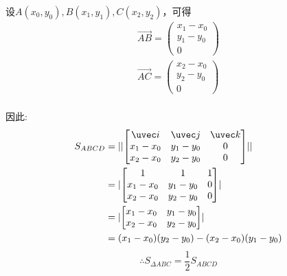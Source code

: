 设$A(x_0, y_0), B(x_1, y_1), C(x_2, y_2)$，可得
\begin{equation}
\begin{aligned}
\vec{AB}=\begin{pmatrix}x_1-x_0 \\ y_1-y_0\\0\end{pmatrix}\\
\vec{AC}=\begin{pmatrix}x_2-x_0 \\ y_2-y_0\\0\end{pmatrix}\\
\end{aligned}
\end{equation}

因此:
\begin{equation}
\begin{aligned}
S_{ABCD}&=\lvert\lvert \begin{bmatrix}
\uvec i & \uvec j & \uvec k \\
x_1-x_0 & y_1-y_0 & 0\\
x_2-x_0 & y_2-y_0 & 0
\end{bmatrix}\rvert\rvert \\
&= \lvert \begin{bmatrix}
1 & 1 & 1 \\
x_1-x_0 & y_1-y_0 & 0\\
x_2-x_0 & y_2-y_0 & 0
\end{bmatrix}\rvert\\
&= \lvert \begin{bmatrix}
x_1-x_0 & y_1-y_0 \\
x_2-x_0 & y_2-y_0 
\end{bmatrix}\rvert \\
&=(x_1-x_0)(y_2-y_0)-(x_2-x_0)(y_1-y_0)
\end{aligned}
\end{equation}
$$\therefore S_{\Delta ABC}=\frac{1}{2} S_{ABCD}$$